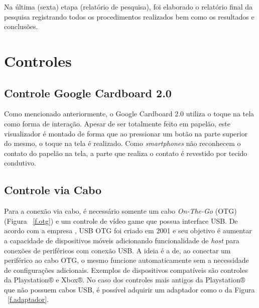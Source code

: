 Na última (sexta) etapa (relatório de pesquisa), foi elaborado o relatório final da pesquisa registrando todos os procedimentos realizados bem como os resultados e conclusões.

\section{Controles}

\subsection{Controle Google Cardboard 2.0}
\label{ss.cardboard}

Como mencionado anteriormente, o Google Cardboard 2.0 utiliza o toque na tela como forma de interação. Apesar de ser totalmente feito em papelão, este visualizador é montado de forma que ao pressionar um botão na parte superior do mesmo, o toque na tela é realizado. Como \textit{smartphones} não reconhecem o contato do papelão na tela, a parte que realiza o contato é revestido por tecido condutivo.

\subsection{Controle via Cabo}
\label{ss.cabo}

Para a conexão via cabo, é necessário somente um cabo \textit{On-The-Go} (OTG) (Figura ~\ref{f.otg}) e um controle de vídeo game que possua interface USB. De acordo com a empresa , USB OTG foi criado em 2001 e seu objetivo é aumentar a capacidade de dispositivos móveis adicionando funcionalidade de \textit{host} para conexões de periféricos com conexão USB. A ideia é a de, ao conectar um periférico ao cabo OTG, o mesmo funcione automaticamente sem a necessidade de configurações adicionais.
Exemplos de dispositivos compatíveis são controles da Playstation® e Xbox®. No caso dos controles mais antigos da Playstation® que não possuem cabos USB, é possível adquirir um adaptador como o da Figura ~\ref{f.adaptador}.

